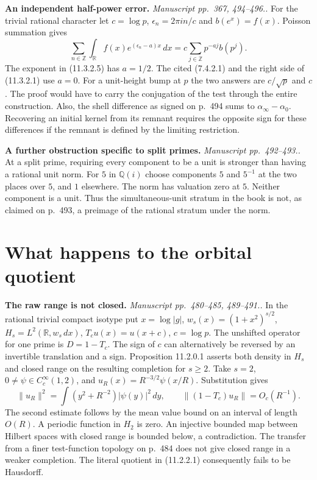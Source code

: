 \documentclass[11pt,letterpaper]{article}
\newcommand{\R}{\mathbb R}
\newcommand{\Q}{\mathbb Q}
\newcommand{\Z}{\mathbb Z}
\newcommand{\loc}[1]{\textit{Manuscript #1.}}
\newcommand{\head}[1]{\par\smallskip\textbf{#1}\enspace}
\begin{document}
\head{An independent half-power error.} \loc{pp.~367, 494--496.}
For the trivial rational character let $c=\log p$, $\epsilon_n=2\pi i n/c$ and $b(e^x)=f(x)$. Poisson summation gives
\[
 \sum_{n\in\Z}\int_{\R}f(x)e^{(\epsilon_n-a)x}\,dx
 =c\sum_{j\in\Z}p^{-aj}b(p^j).
\]
The exponent in (11.3.2.5) has $a=1/2$. The cited (7.4.2.1) and the right side of (11.3.2.1) use $a=0$. For a unit-height bump at $p$ the two answers are $c/\sqrt p$ and $c$. The proof would have to carry the conjugation of the test through the entire construction. Also, the shell difference as signed on p.~494 sums to $\alpha_\infty-\alpha_0$. Recovering an initial kernel from its remnant requires the opposite sign for these differences if the remnant is defined by the limiting restriction.

\head{A further obstruction specific to split primes.} \loc{pp.~492--493.}
At a split prime, requiring every component to be a unit is stronger than having a rational unit norm. For $5$ in $\Q(i)$ choose components $5$ and $5^{-1}$ at the two places over $5$, and $1$ elsewhere. The norm has valuation zero at $5$. Neither component is a unit. Thus the simultaneous-unit stratum in the book is not, as claimed on p.~493, a preimage of the rational stratum under the norm.

\section{What happens to the orbital quotient}\label{sec:quotient}

\head{The raw range is not closed.} \loc{pp.~480--485, 489--491.}
In the rational trivial compact isotype put $x=\log|g|$, $w_s(x)=(1+x^2)^{s/2}$, $H_s=L^2(\R,w_s\,dx)$, $T_cu(x)=u(x+c)$, $c=\log p$. The unshifted operator for one prime is $D=1-T_c$. The sign of $c$ can alternatively be reversed by an invertible translation and a sign. Proposition 11.2.0.1 asserts both density in $H_s$ and closed range on the resulting completion for $s\ge2$. Take $s=2$, $0\ne\psi\in C_c^\infty(1,2)$, and $u_R(x)=R^{-3/2}\psi(x/R)$. Substitution gives
\[
 \|u_R\|^2=\int(y^2+R^{-2})|\psi(y)|^2\,dy,\qquad
 \|(1-T_c)u_R\|=O_c(R^{-1}).
\]
The second estimate follows by the mean value bound on an interval of length $O(R)$. A periodic function in $H_2$ is zero. An injective bounded map between Hilbert spaces with closed range is bounded below, a contradiction. The transfer from a finer test-function topology on p.~484 does not give closed range in a weaker completion. The literal quotient in (11.2.2.1) consequently fails to be Hausdorff.
\end{document}
